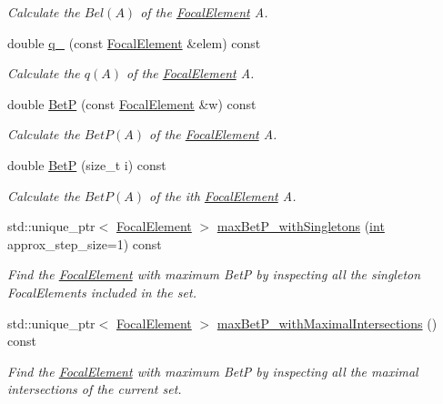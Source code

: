 \begin{DoxyCompactItemize}
\begin{DoxyCompactList}\small\item\em Calculate the $Bel(A)$ of the \hyperlink{classFocalElement}{Focal\+Element} A. \end{DoxyCompactList}\item 
double \hyperlink{classEvidence_a0374141346cfc31e86c9dd19659fbb0c}{q\+\_\+} (const \hyperlink{classFocalElement}{Focal\+Element} \&elem) const 
\begin{DoxyCompactList}\small\item\em Calculate the $q(A)$ of the \hyperlink{classFocalElement}{Focal\+Element} A. \end{DoxyCompactList}\item 
double \hyperlink{classEvidence_ae5e4bfa5009105ed1f61349eaad4cf9a}{BetP} (const \hyperlink{classFocalElement}{Focal\+Element} \&w) const 
\begin{DoxyCompactList}\small\item\em Calculate the $BetP(A)$ of the \hyperlink{classFocalElement}{Focal\+Element} A. \end{DoxyCompactList}\item 
double \hyperlink{classEvidence_ae417c974c680ef23eade3016e89b45b1}{BetP} (size\+\_\+t i) const 
\begin{DoxyCompactList}\small\item\em Calculate the $BetP(A)$ of the ith \hyperlink{classFocalElement}{Focal\+Element} A. \end{DoxyCompactList}\item 
std\+::unique\+\_\+ptr$<$ \hyperlink{classFocalElement}{Focal\+Element} $>$ \hyperlink{classEvidence_a2f311e3b5f265b2f138d3b48e4a3eefc}{max\+Bet\+P\+\_\+with\+Singletons} (\hyperlink{CMakeCache_8txt_a79a3d8790b2588b09777910863574e09}{int} approx\+\_\+step\+\_\+size=1) const 
\begin{DoxyCompactList}\small\item\em Find the \hyperlink{classFocalElement}{Focal\+Element} with maximum BetP by inspecting all the singleton Focal\+Elements included in the set. \end{DoxyCompactList}\item 
std\+::unique\+\_\+ptr$<$ \hyperlink{classFocalElement}{Focal\+Element} $>$ \hyperlink{classEvidence_a811a53979eb5a0b366fb47257ee6b920}{max\+Bet\+P\+\_\+with\+Maximal\+Intersections} () const 
\begin{DoxyCompactList}\small\item\em Find the \hyperlink{classFocalElement}{Focal\+Element} with maximum BetP by inspecting all the maximal intersections of the current set. \end{DoxyCompactList}\item 

\end{DoxyCompactItemize}
